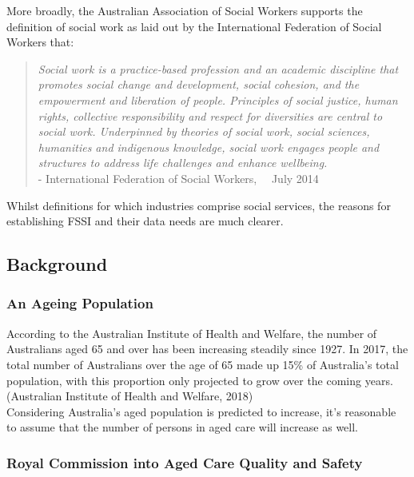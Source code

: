 \documentclass[11pt,]{article}
\begin{document}
More broadly, the Australian Association of Social Workers supports the
definition of social work as laid out by the International Federation of
Social Workers that:

\begin{quote}
\emph{Social work is a practice-based profession and an academic
discipline that promotes social change and development, social cohesion,
and the empowerment and liberation of people. Principles of social
justice, human rights, collective responsibility and respect for
diversities are central to social work. Underpinned by theories of
social work, social sciences, humanities and indigenous knowledge,
social work engages people and structures to address life challenges and
enhance wellbeing.}\\
\quad - International Federation of Social Workers,
\newline \quad \quad ~~July 2014
\end{quote}

Whilst definitions for which industries comprise social services, the
reasons for establishing FSSI and their data needs are much clearer.

\subsection{Background}\label{background}

\subsubsection{An Ageing Population}\label{an-ageing-population}

According to the Australian Institute of Health and Welfare, the number
of Australians aged 65 and over has been increasing steadily since 1927.
In 2017, the total number of Australians over the age of 65 made up 15\%
of Australia's total population, with this proportion only projected to
grow over the coming years. (Australian Institute of Health and Welfare,
2018)\\
Considering Australia's aged population is predicted to increase, it's
reasonable to assume that the number of persons in aged care will
increase as well.

\newpage

\subsubsection{Royal Commission into Aged Care Quality and
Safety}\label{royal-commission-into-aged-care-quality-and-safety}
\end{document}
